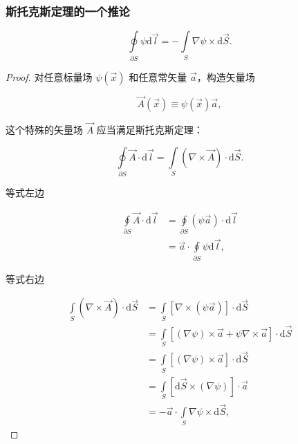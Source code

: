 \subsubsection{斯托克斯定理的一个推论}

\begin{example}
\begin{equation}
\oint\limits_{\partial S } \psi \mathrm{d}\vec{l}
=-\int\limits_{S} \nabla\psi\times\mathrm{d}\vec{S}.
\end{equation}
\end{example}

\begin{proof}

对任意标量场 $\psi(\vec{x}) $ 和任意常矢量 $\vec{a} $，构造矢量场

\begin{equation}
\vec{A}(\vec{x})
\equiv \psi (\vec{x}) \vec{a},
\end{equation}

这个特殊的矢量场 $\vec{A} $ 应当满足斯托克斯定理：

\begin{equation}
\oint\limits_{\partial S} \vec{A}\cdot\mathrm{d}\vec{l}
=\int\limits_{S} \left(\nabla \times \vec{A} \right) \cdot \mathrm{d}\vec{S}.
\end{equation}

等式左边

\begin{equation}
\begin{split}
\oint\limits_{\partial S} \vec{A}\cdot\mathrm{d}\vec{l}
&=\oint\limits_{\partial S} \left(\psi \vec{a} \right)\cdot\mathrm{d}\vec{l} \\
&=\vec{a} \cdot \oint\limits_{\partial S} \psi \mathrm{d}\vec{l},
\end{split}
\end{equation}

等式右边

\begin{equation}
\begin{split}
\int\limits_{S} \left(\nabla \times \vec{A} \right) \cdot \mathrm{d}\vec{S}
&=\int\limits_{S} \left[\nabla \times \left(\psi \vec{a} \right) \right] \cdot \mathrm{d}\vec{S} \\
&=\int\limits_{S} \left[\left(\nabla \psi \right) \times \vec{a} + \psi \nabla \times \vec{a} \right] \cdot \mathrm{d}\vec{S} \\
&=\int\limits_{S} \left[\left(\nabla \psi \right) \times \vec{a} \right] \cdot \mathrm{d}\vec{S} \\
&=\int\limits_{S} \left[\mathrm{d}\vec{S} \times \left(\nabla \psi \right) \right] \cdot \vec{a} \\
&=-\vec{a} \cdot \int\limits_{S} \nabla \psi \times \mathrm{d}\vec{S},
\end{split}
\end{equation}


\end{proof}

